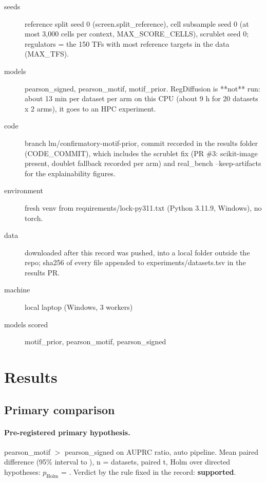 \documentclass{article}
\begin{document}
\begin{description}
\item[seeds] reference split seed 0 (screen.split\_reference), cell subsample seed 0 (at most 3,000 cells per context, MAX\_SCORE\_CELLS), scrublet seed 0; regulators = the 150 TFs with most reference targets in the data (MAX\_TFS).
\item[models] pearson\_signed, pearson\_motif, motif\_prior. RegDiffusion is **not** run: about 13 min per dataset per arm on this CPU (about 9 h for 20 datasets x 2 arms), it goes to an HPC experiment.
\item[code] branch lm/confirmatory-motif-prior, commit recorded in the results folder (CODE\_COMMIT), which includes the scrublet fix (PR \#3: scikit-image present, doublet fallback recorded per arm) and real\_bench --keep-artifacts for the explainability figures.
\item[environment] fresh venv from requirements/lock-py311.txt (Python 3.11.9, Windows), no torch.
\item[data] downloaded after this record was pushed, into a local folder outside the repo; sha256 of every file appended to experiments/datasets.tsv in the results PR.
\item[machine] local laptop (Windows, 3 workers)
\item[models scored] motif\_prior, pearson\_motif, pearson\_signed
\end{description}

\section{Results}
\subsection{Primary comparison}
\paragraph{Pre-registered primary hypothesis.} pearson\_motif $>$ pearson\_signed on AUPRC ratio, auto pipeline. Mean paired difference \gbDiffAuprcRatioAutoPearsonMotifVsPearsonSigned{} (95\% interval \gbCiLowAuprcRatioAutoPearsonMotifVsPearsonSigned{} to \gbCiHighAuprcRatioAutoPearsonMotifVsPearsonSigned{}), n = \gbNAuprcRatioAutoPearsonMotifVsPearsonSigned{} datasets, paired t, Holm over \gbFamilyAuprcRatioAuto{} directed hypotheses: $p_{\mathrm{Holm}}$ = \gbPHolmAuprcRatioAutoPearsonMotifVsPearsonSigned{}. Verdict by the rule fixed in the record: \textbf{supported}.
\end{document}
